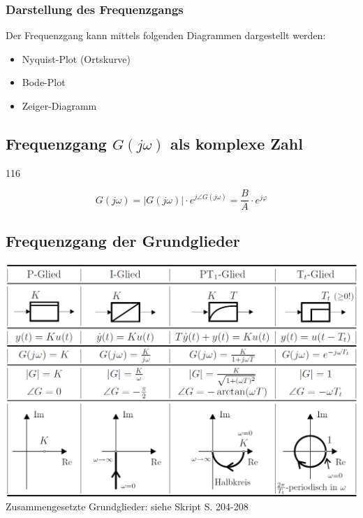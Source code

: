 \subsubsection{Darstellung des Frequenzgangs}

Der Frequenzgang kann mittels folgenden Diagrammen dargestellt werden: 

\begin{itemize}
    \item Nyquist-Plot (Ortskurve)
    \item Bode-Plot
    \item Zeiger-Diagramm %
\end{itemize}


\subsection{Frequenzgang $G(j \omega)$ als komplexe Zahl}{116}

\vspace{-0.3cm} %
$$ \boxed{ G(j \omega) = |G(j \omega)| \cdot e^{j \angle G(j \omega)} = \frac{B}{A} \cdot e^{j  \varphi} } $$


\subsection{Frequenzgang der Grundglieder}

\includegraphics[width=\columnwidth]{images/frequenzgaenge_grundglieder.png} \\
\textrightarrow Zusammengesetzte Grundglieder: siehe Skript S. 204-208



